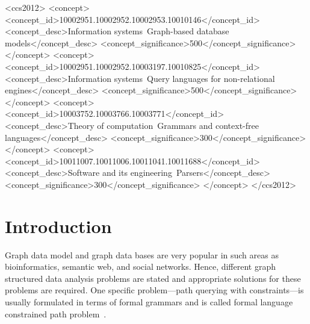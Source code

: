 \documentclass[sigconf]{acmart}
\begin{document}
%
%
\begin{CCSXML}
<ccs2012>
<concept>
<concept_id>10002951.10002952.10002953.10010146</concept_id>
<concept_desc>Information systems~Graph-based database models</concept_desc>
<concept_significance>500</concept_significance>
</concept>
<concept>
<concept_id>10002951.10002952.10003197.10010825</concept_id>
<concept_desc>Information systems~Query languages for non-relational engines</concept_desc>
<concept_significance>500</concept_significance>
</concept>
<concept>
<concept_id>10003752.10003766.10003771</concept_id>
<concept_desc>Theory of computation~Grammars and context-free languages</concept_desc>
<concept_significance>300</concept_significance>
</concept>
<concept>
<concept_id>10011007.10011006.10011041.10011688</concept_id>
<concept_desc>Software and its engineering~Parsers</concept_desc>
<concept_significance>300</concept_significance>
</concept>
</ccs2012>
\end{CCSXML}




\maketitle

\section{Introduction}
Graph data model and graph data bases are very popular in such areas as bioinformatics, semantic web, and social networks.
Hence, different graph structured data analysis problems are stated and appropriate solutions for these problems are required.
One specific problem---path querying with constraints---is usually formulated in terms of formal grammars and is called formal language constrained path problem~\cite{FLCpathProblem}.
\end{document}
